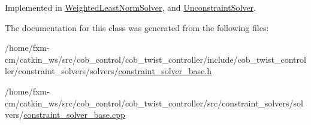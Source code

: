 Implemented in \hyperlink{classWeightedLeastNormSolver_a0868fb81e9e75999037d96b4a6407ce7}{Weighted\-Least\-Norm\-Solver}, and \hyperlink{classUnconstraintSolver_a72e63efba891d2a55f4c95746b8d7b33}{Unconstraint\-Solver}.



The documentation for this class was generated from the following files\-:\begin{DoxyCompactItemize}
\item 
/home/fxm-\/cm/catkin\-\_\-ws/src/cob\-\_\-control/cob\-\_\-twist\-\_\-controller/include/cob\-\_\-twist\-\_\-controller/constraint\-\_\-solvers/solvers/\hyperlink{constraint__solver__base_8h}{constraint\-\_\-solver\-\_\-base.\-h}\item 
/home/fxm-\/cm/catkin\-\_\-ws/src/cob\-\_\-control/cob\-\_\-twist\-\_\-controller/src/constraint\-\_\-solvers/solvers/\hyperlink{constraint__solver__base_8cpp}{constraint\-\_\-solver\-\_\-base.\-cpp}\end{DoxyCompactItemize}
